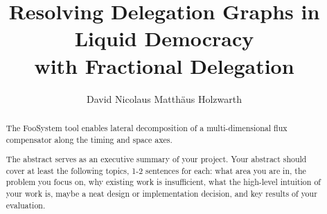 \documentclass[a4paper,11pt,oneside]{report}
\title{Resolving Delegation Graphs in Liquid Democracy\\ with Fractional Delegation}
\author{David Nicolaus Matthäus Holzwarth}
\newcommand{\sysname}{FooSystem\xspace}
\begin{document}
\maketitle

\begin{abstract}
The \sysname tool enables lateral decomposition of a multi-dimensional
flux compensator along the timing and space axes.

The abstract serves as an executive summary of your project.
Your abstract should cover at least the following topics, 1-2 sentences for
each: what area you are in, the problem you focus on, why existing work is
insufficient, what the high-level intuition of your work is, maybe a neat
design or implementation decision, and key results of your evaluation.
\end{abstract}


\maketoc










\cleardoublepage
{}
{}
\printbibliography

%
%
\end{document}
